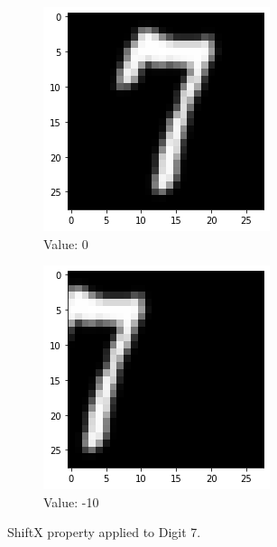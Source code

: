 \begin{figure}[htb!]
\begin{subfigure}[b]{.3\textwidth}
            \includegraphics[width=\textwidth]{images/shiftx2.png}
            \caption{Value: 0}
            \label{fig:Rotate-misclass0}
        \end{subfigure}%
        \begin{subfigure}[b]{.3\textwidth}
            \centering
            \includegraphics[width=\linewidth]{images/shiftx3.png}
            \caption{Value: -10}
            \label{fig:Rotate-misclass0}
        \end{subfigure}
        
        \caption{ShiftX property applied to Digit 7.}
        \label{fig:ShiftX-property}
    \end{figure}
    \FloatBarrier
    
